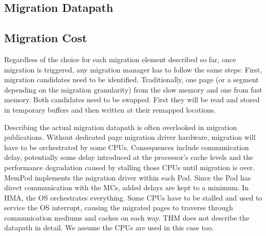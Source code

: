 \subsection {Migration Datapath}

\subsection{Migration Cost}
Regardless of the choice for each migration element described so far, once migration is triggered, any migration manager has to follow the same steps: First, migration candidates need to be identified. Traditionally, one page (or a segment depending on the migration granularity) from the slow memory and one from fast memory. Both candidates need to be swapped. First they will be read and stored in temporary buffers and then written at their remapped locations. 

Describing the actual migration datapath is often overlooked in migration publications. Without dedicated page migration driver hardware, migration will have to be orchestrated by some CPUs. Consequences include communication delay, potentially some delay introduced at the processor's cache levels and the performance degradation caused by stalling those CPUs until migration is over. MemPod implements the migration driver within each Pod. Since the Pod has direct communication with the MCs, added delays are kept to a minimum. In HMA, the OS orchestrates everything. Some CPUs have to be stalled and used to service the OS interrupt, causing the migrated pages to traverse through communication mediums and caches on each way. THM does not describe the datapath in detail. We assume the CPUs are used in this case too.

